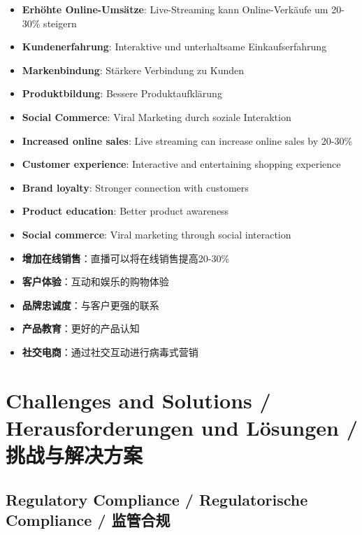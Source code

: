 \begin{otherlanguage}{ngerman}
\begin{itemize}
    \item \textbf{Erhöhte Online-Umsätze}: Live-Streaming kann Online-Verkäufe um 20-30\% steigern
    \item \textbf{Kundenerfahrung}: Interaktive und unterhaltsame Einkaufserfahrung
    \item \textbf{Markenbindung}: Stärkere Verbindung zu Kunden
    \item \textbf{Produktbildung}: Bessere Produktaufklärung
    \item \textbf{Social Commerce}: Viral Marketing durch soziale Interaktion
\end{itemize}
\end{otherlanguage}

\begin{itemize}
    \item \textbf{Increased online sales}: Live streaming can increase online sales by 20-30\%
    \item \textbf{Customer experience}: Interactive and entertaining shopping experience
    \item \textbf{Brand loyalty}: Stronger connection with customers
    \item \textbf{Product education}: Better product awareness
    \item \textbf{Social commerce}: Viral marketing through social interaction
\end{itemize}

\begin{itemize}
    \item \textbf{增加在线销售}：直播可以将在线销售提高20-30\%
    \item \textbf{客户体验}：互动和娱乐的购物体验
    \item \textbf{品牌忠诚度}：与客户更强的联系
    \item \textbf{产品教育}：更好的产品认知
    \item \textbf{社交电商}：通过社交互动进行病毒式营销
\end{itemize}

\section{Challenges and Solutions / Herausforderungen und Lösungen / 挑战与解决方案}

\subsection{Regulatory Compliance / Regulatorische Compliance / 监管合规}

